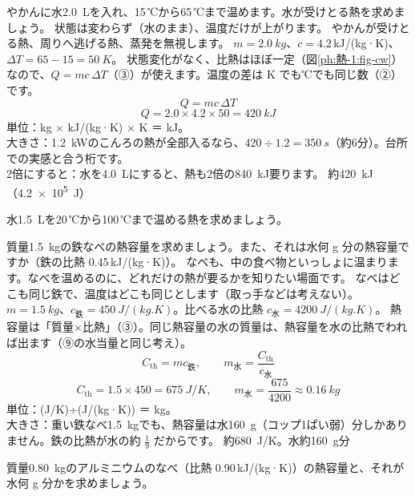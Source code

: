 \label{ph:熱-1:ex2}
\begin{phreidai}[やかんでお湯をわかす熱]
やかんに水\qty{2.0}{L}を入れ、15\,℃から65\,℃まで温めます。水が受けとる熱を求めましょう。
\phbamen
状態は変わらず（水のまま）、温度だけが上がります。
\phmushi
やかんが受けとる熱、周りへ逃げる熱、蒸発を無視します。
\phzu
$m=\qty{2.0}{kg}$、$c=4.2$\,kJ/(kg·K)、$\Delta T=65-15=\qty{50}{K}$。
\phriyu
状態変化がなく、比熱はほぼ一定（図\ref{ph:熱-1:fig-cw}）なので、$Q=mc\,\Delta T$（③）が使えます。温度の差は K でも℃でも同じ数（②）です。
\phtateru
\[Q=mc\,\Delta T\]
\phtoku
\[Q=2.0\times4.2\times50=\qty{420}{kJ}\]
\phtashikame
単位：kg × kJ/(kg·K) × K ＝ kJ。\\
大きさ：\qty{1.2}{kW}のこんろの熱が全部入るなら、$420\div1.2=\qty{350}{s}$（約6分）。台所での実感と合う桁です。\\
2倍にすると：水を\qty{4.0}{L}にすると、熱も2倍の\qty{840}{kJ}要ります。
\kotae 約\qty{420}{kJ}（\qty{4.2e5}{J}）
\end{phreidai}
\begin{jibun}
水\qty{1.5}{L}を20\,℃から100\,℃まで温める熱を求めましょう。
\end{jibun}

\label{ph:熱-1:ex3}
\begin{phreidai}[鉄なべの熱容量]
質量\qty{1.5}{kg}の鉄なべの熱容量を求めましょう。また、それは水何 g 分の熱容量ですか（鉄の比熱 0.45\,kJ/(kg·K)）。
\phbamen
なべも、中の食べ物といっしょに温まります。なべを温めるのに、どれだけの熱が要るかを知りたい場面です。
\phmushi
なべはどこも同じ鉄で、温度はどこも同じとします（取っ手などは考えない）。
\phzu
$m=\qty{1.5}{kg}$、$c_{\text{鉄}}=\qty{450}{J/(kg.K)}$。比べる水の比熱 $c_{\text{水}}=\qty{4200}{J/(kg.K)}$。
\phriyu
熱容量は「質量×比熱」（③）。同じ熱容量の水の質量は、熱容量を水の比熱でわれば出ます（⑨の水当量と同じ考え）。
\phtateru
\[C_{\mathrm{th}}=mc_{\text{鉄}},\qquad m_{\text{水}}=\frac{C_{\mathrm{th}}}{c_{\text{水}}}\]
\phtoku
\[C_{\mathrm{th}}=1.5\times450=\qty{675}{J/K},\qquad m_{\text{水}}=\frac{675}{4200}\approx\qty{0.16}{kg}\]
\phtashikame
単位：(J/K)÷(J/(kg·K)) ＝ kg。\\
大きさ：重い鉄なべ\qty{1.5}{kg}でも、熱容量は水\qty{160}{g}（コップ1ぱい弱）分しかありません。鉄の比熱が水の約 $\tfrac{1}{9}$ だからです。
\kotae 約\qty{680}{J/K}。水約\qty{160}{g}分
\end{phreidai}
\begin{jibun}
質量\qty{0.80}{kg}のアルミニウムのなべ（比熱 0.90\,kJ/(kg·K)）の熱容量と、それが水何 g 分かを求めましょう。
\end{jibun}

